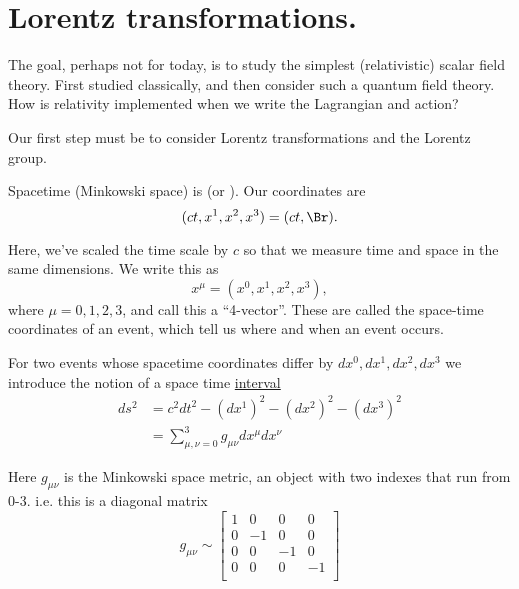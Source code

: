 %
%
\section{Lorentz transformations.}

The goal, perhaps not for today, is to study the simplest (relativistic) scalar field theory.  First studied classically, and then consider such a quantum field theory.
How is relativity implemented when we write the Lagrangian and action?

Our first step must be to consider Lorentz transformations and the Lorentz group.

Spacetime (Minkowski space) is  (or ).  Our coordinates are
\begin{equation}\label{eqn:qftLecture2:340}
(c t, x^1, x^2, x^3) = (c t, \Br).
\end{equation}

Here, we've scaled the time scale by \( c \) so that we measure time and space in the same dimensions.  We write this as
\begin{equation}\label{eqn:qftLecture2:360}
x^\mu = (x^0, x^1, x^2, x^3),
\end{equation}
%
where \( \mu = 0, 1, 2, 3 \), and call this a ``4-vector''.  These are called the space-time coordinates of an event, which tell us where and when an event occurs.

For two events whose spacetime coordinates differ by \( dx^0, dx^1, dx^2, dx^3 \) we introduce the notion of a space time \underline{interval}
\begin{equation}\label{eqn:qftLecture2:380}
\begin{aligned}
ds^2
&= c^2 dt^2
- (dx^1)^2
- (dx^2)^2
- (dx^3)^2 \\
&=
\sum_{\mu, \nu = 0}^3 g_{\mu\nu} dx^\mu dx^\nu
\end{aligned}
\end{equation}

Here \( g_{\mu\nu} \) is the Minkowski space metric, an object with two indexes that run from 0-3.  i.e. this is a diagonal matrix
\begin{equation}\label{eqn:qftLecture2:400}
g_{\mu\nu} \sim
\begin{bmatrix}
1 & 0 & 0 & 0 \\
0 & -1 & 0 & 0 \\
0 & 0 & -1 & 0 \\
0 & 0 & 0 & -1 \\
\end{bmatrix}
\end{equation}

